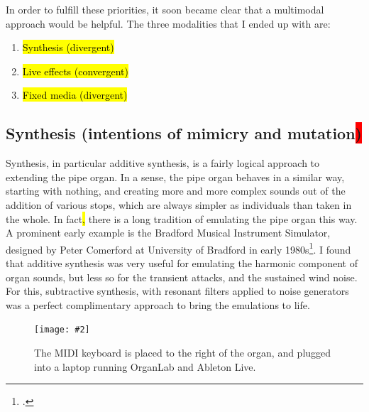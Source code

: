 \documentclass[12pt,twoside,maitrise]{dms_ks}
\newcommand{\customincludegraphics}[4][]{%
    \begin{figure}[H]
        \centering
        \texttt{[image: \#2]}
        \caption{#4}
	\label{#3} 
    \end{figure}
}
\theoremstyle{definition}
\begin{document}
{In order to fulfill these priorities, it soon became clear that a multimodal approach would be helpful. 
The three modalities that I ended up with are:

\begin{enumerate}
  \item \hl{Synthesis (divergent)}
  
  \item \hl{Live effects (convergent)}
  
  \item \hl{Fixed media (divergent)}
\end{enumerate}

\subsection{Synthesis (intentions of mimicry and mutation\colorbox{red}{)}}

Synthesis, in particular additive synthesis, is a fairly logical approach to extending the pipe organ. 
In a sense, the pipe organ behaves in a similar way, starting with nothing, and creating more and more complex sounds out of the addition of various stops, which are always simpler as individuals than taken in the whole. 
In fact\hl{,} there is a long tradition of emulating the pipe organ this way. 
A prominent early example is the Bradford Musical Instrument Simulator, designed by Peter Comerford at University of Bradford in early 1980s\footcite[61]{comerford_simulating_1993}. 
I found that additive synthesis was very useful for emulating the harmonic component of organ sounds, but less so for the transient attacks, and the sustained wind noise. 
For this, subtractive synthesis, with resonant filters applied to noise generators was a perfect complimentary approach to bring the emulations to life.

\customincludegraphics[scale=0.065]{IMG_3414_copy.jpg}{fig:interface}{The MIDI keyboard is placed to the right of the organ, and plugged into a laptop running OrganLab and Ableton Live.}

}
\end{document}
